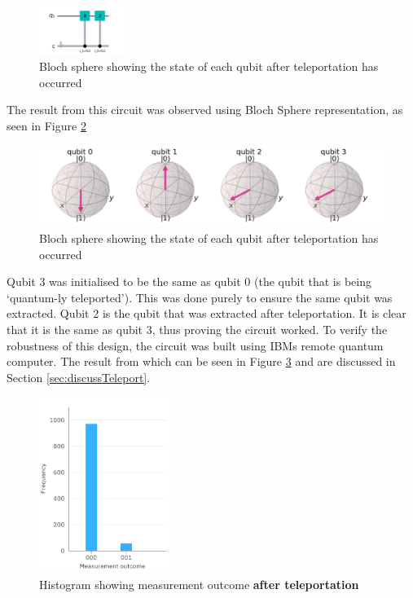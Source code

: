 \begin{figure}[h]
    \centering
    \includegraphics[width=0.25\textwidth]{lab3/images/Step4.png}
    \caption{Bloch sphere showing the state of each qubit after teleportation has occurred}
    \label{fig:step4}
\end{figure}

The result from this circuit was observed using Bloch Sphere representation, as seen in Figure \ref{fig:teleportBloch}
\begin{figure}[h]
    \centering
    \includegraphics[width=\textwidth]{lab3/images/teleportBloch.png}
    \caption{Bloch sphere showing the state of each qubit after teleportation has occurred}
    \label{fig:teleportBloch}
\end{figure}

Qubit 3 was initialised to be the same as qubit 0 (the qubit that is being `quantum-ly teleported'). This was done purely to ensure the same qubit was extracted. Qubit 2 is the qubit that was extracted after teleportation. It is clear that it is the same as qubit 3, thus proving the circuit worked. To verify the robustness of this design, the circuit was built using IBMs remote quantum computer. The result from which can be seen in Figure \ref{fig:ibmTeleport} and are discussed in Section \ref{sec:discussTeleport}.
\begin{figure}[h]
    \centering
    \includegraphics[width=0.38\textwidth]{lab3/images/ibmTeleport.png}
    \caption{Histogram showing measurement outcome \textbf{after teleportation}}
    \label{fig:ibmTeleport}
\end{figure}

